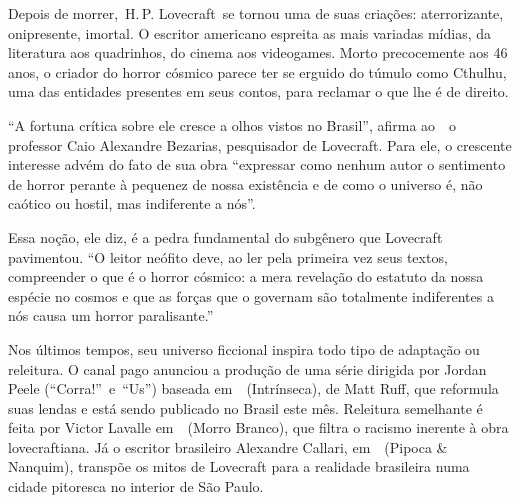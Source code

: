 \pagebreak

\begin{changemargin}
\hspace{.5cm}
\vspace*{1cm}
\enlargethispage{-\baselineskip}


\medskip

\hfill{}

\bigskip

Depois de morrer, H.\,P. Lovecraft se tornou uma de suas criações: aterrorizante, onipresente, imortal. O escritor americano espreita as mais variadas mídias, da literatura aos quadrinhos, do cinema aos videogames. Morto precocemente aos 46 anos, o criador do horror cósmico parece ter se erguido do túmulo como Cthulhu, uma das entidades presentes em seus contos, para reclamar o que lhe é de direito.

“A fortuna crítica sobre ele cresce a olhos vistos no Brasil”, afirma ao {} o professor Caio Alexandre Bezarias, pesquisador de Lovecraft. Para ele, o crescente interesse advém do fato de sua obra “expressar como nenhum autor o sentimento de horror perante à pequenez de nossa existência e de como o universo é, não caótico ou hostil, mas indiferente a nós”. 

Essa noção, ele diz, é a pedra fundamental do subgênero que Lovecraft pavimentou. “O leitor neófito deve, ao ler pela primeira vez seus textos, compreender o que é o horror cósmico: a mera revelação do estatuto da nossa espécie no cosmos e que as forças que o governam são totalmente indiferentes a nós causa um horror paralisante.”

Nos últimos tempos, seu universo ficcional inspira todo tipo de adaptação ou releitura. O canal pago  anunciou a produção de uma série dirigida por Jordan Peele (“Corra!” e “Us”) baseada em {} (Intrínseca), de Matt Ruff, que reformula suas lendas e está sendo publicado no Brasil este mês. Releitura semelhante é feita por Victor Lavalle em {} (Morro Branco), que filtra o racismo inerente à obra lovecraftiana. Já o escritor brasileiro Alexandre Callari, em {} (Pipoca \& Nanquim), transpõe os mitos de Lovecraft para a realidade brasileira numa cidade pitoresca no interior de São Paulo. 


\end{changemargin}

